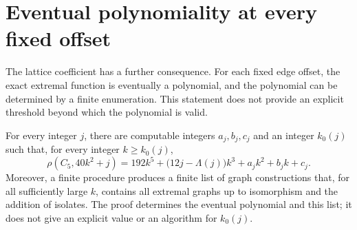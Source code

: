 \section{Eventual polynomiality at every fixed offset}
\label{sec:eventual-polynomial}

The lattice coefficient has a further consequence. For each fixed edge
offset, the exact extremal function is eventually a polynomial, and the
polynomial can be determined by a finite enumeration. This statement
does not provide an explicit threshold beyond which the polynomial is
valid.

\begin{theorem}
\label{thm:eventual-polynomial}
For every integer $j$, there are computable integers $a_j,b_j,c_j$ and
an integer $k_0(j)$ such that, for every integer $k\geq k_0(j)$,
\begin{equation}\tag{71}\label{eq:eventual-polynomial}
 \rho(C_5,40k^2+j)
 =192k^5+\bigl(12j-\Lambda(j)\bigr)k^3+a_jk^2+b_jk+c_j.
\end{equation}
Moreover, a finite procedure produces a finite list of graph
constructions that, for all sufficiently large $k$, contains all
extremal graphs up to isomorphism and the addition of isolates. The
proof determines the eventual polynomial and this list; it does not
give an explicit value or an algorithm for $k_0(j)$.
\end{theorem}
